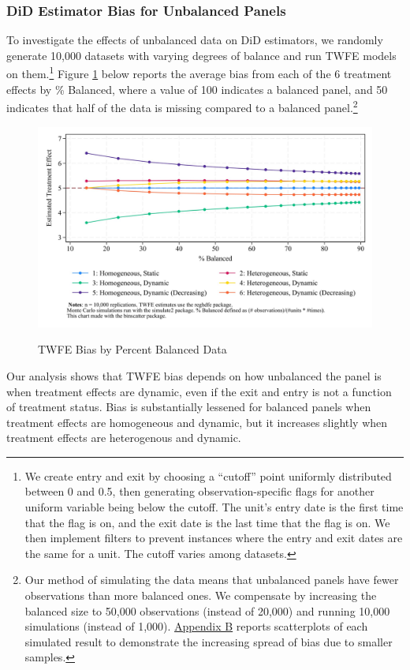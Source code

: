 \documentclass[12pt]{article}
\begin{document}
\subsubsection{DiD Estimator Bias for Unbalanced Panels}
To investigate the effects of unbalanced data on DiD estimators, we randomly generate 10,000 datasets with varying degrees of balance and run TWFE models on them.\footnote{We create entry and exit by choosing a “cutoff” point uniformly distributed between 0 and 0.5, then generating observation-specific flags for another uniform variable being below the cutoff. The unit’s entry date is the first time that the flag is on, and the exit date is the last time that the flag is on. We then implement filters to prevent instances where the entry and exit dates are the same for a unit. The cutoff varies among datasets.}  Figure \ref{fig:pc-balance} below reports the average bias from each of the 6 treatment effects by \% Balanced, where a value of 100 indicates a balanced panel, and 50 indicates that half of the data is missing compared to a balanced panel.\footnote{Our method of simulating the data means that unbalanced panels have fewer observations than more balanced ones. We compensate by increasing the balanced size to 50,000 observations (instead of 20,000) and running 10,000 simulations (instead of 1,000). \hyperref[sec:appendixb]{Appendix B} reports scatterplots of each simulated result to demonstrate the increasing spread of bias due to smaller samples.}
\begin{figure}[H]
    \centering
    \caption{TWFE Bias by Percent Balanced Data}
    \includegraphics[width=6in]{Figures/TWFE Bias by Percent Balanced Crop.jpg}
    \label{fig:pc-balance}
\end{figure}
\noindent
Our analysis shows that TWFE bias depends on how unbalanced the panel is when treatment effects are dynamic, even if the exit and entry is not a function of treatment status. Bias is substantially lessened for balanced panels when treatment effects are homogeneous and dynamic, but it increases slightly when treatment effects are heterogenous and dynamic.
\end{document}
